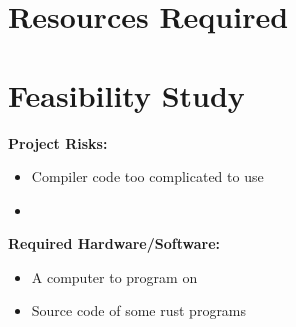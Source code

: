 \documentclass[12pt, a4paper]{article}
\begin{document}
\section{Resources Required}

\section{Feasibility Study}

\textbf{Project Risks:}
\begin{itemize}
	\item Compiler code too complicated to use
	\item

\end{itemize}

\textbf{Required Hardware/Software:}
\begin{itemize}
	\item A computer to program on
	\item Source code of some rust programs

\end{itemize}
\end{document}
